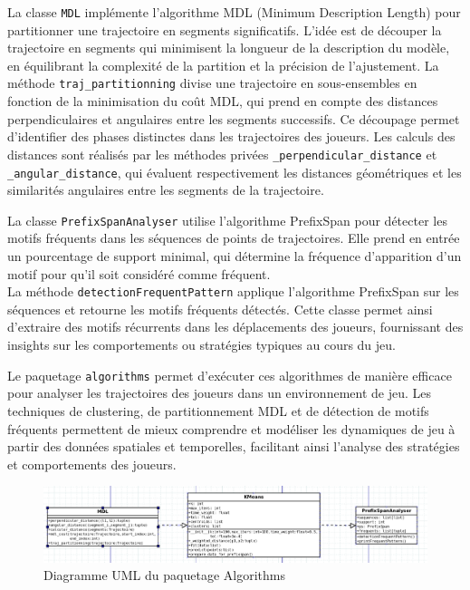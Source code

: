 \documentclass{article}
\begin{document}
        La classe \texttt{MDL} implémente l'algorithme MDL (Minimum Description Length) pour partitionner une trajectoire en segments significatifs. L'idée est de découper la trajectoire en segments qui minimisent la longueur de la description du modèle, en équilibrant la complexité de la partition et la précision de l'ajustement. La méthode \texttt{traj\_partitionning} divise une trajectoire en sous-ensembles en fonction de la minimisation du coût MDL, qui prend en compte des distances perpendiculaires et angulaires entre les segments successifs. Ce découpage permet d'identifier des phases distinctes dans les trajectoires des joueurs. Les calculs des distances sont réalisés par les méthodes privées \texttt{\_perpendicular\_distance} et \texttt{\_angular\_distance}, qui évaluent respectivement les distances géométriques et les similarités angulaires entre les segments de la trajectoire.
    
        La classe \texttt{PrefixSpanAnalyser} utilise l'algorithme PrefixSpan pour détecter les motifs fréquents dans les séquences de points de trajectoires. Elle prend en entrée un pourcentage de support minimal, qui détermine la fréquence d'apparition d'un motif pour qu'il soit considéré comme fréquent.\\
        La méthode \texttt{detectionFrequentPattern} applique l'algorithme PrefixSpan sur les séquences et retourne les motifs fréquents détectés. Cette classe permet ainsi d'extraire des motifs récurrents dans les déplacements des joueurs, fournissant des insights sur les comportements ou stratégies typiques au cours du jeu.
    
        Le paquetage \texttt{algorithms} permet d'exécuter ces algorithmes de manière efficace pour analyser les trajectoires des joueurs dans un environnement de jeu. Les techniques de clustering, de partitionnement MDL et de détection de motifs fréquents permettent de mieux comprendre et modéliser les dynamiques de jeu à partir des données spatiales et temporelles, facilitant ainsi l'analyse des stratégies et comportements des joueurs.

            \begin{figure}[H]
                \centering
                \includegraphics[width=\textwidth]{img/algorithms.png}
                \caption{Diagramme UML du paquetage Algorithms}
                \label{Diagramme_algorithms}
            \end{figure}
\end{document}
